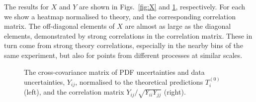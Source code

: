 The results for $X$ and $Y$ are shown in Figs.~\ref{fig:X} and \ref{fig:Y}, respectively. For each we show a heatmap normalised to theory, and the corresponding correlation matrix. The off-diagonal elements of $X$ are almost as large as the diagonal elements, demonstrated by strong correlations in the correlation matrix. These in turn come from strong theory correlations, especially in the nearby bins of the same experiment, but also for points from different processes at similar scales. 
\begin{figure}[h]
    \begin{center}
    \end{center}
  \vspace{-0.55cm}
  \caption{The cross-covariance matrix of PDF uncertainties and data uncertainties, $Y_{ij}$, normalised to the theoretical predictions $T^{(0)}_i$  (left), and the correlation matrix $Y_{ij}/\sqrt{Y_{ii}Y_{jj}}$ (right).}
  \label{fig:Y}
\end{figure}

